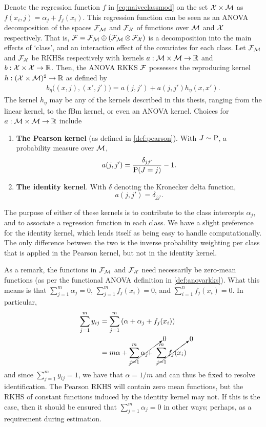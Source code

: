 Denote the regression function $f$ in \cref{eq:naiveclassmod} on the set ${\mathcal X}\times{\mathcal M}$ as $f(x_i,j) = \alpha_j + f_j(x_i)$.
This regression function can be seen as an ANOVA decomposition of the spaces ${\mathcal F}_{\mathcal M}$ and ${\mathcal F}_{\mathcal X}$ of functions over ${\mathcal M}$ and ${\mathcal X}$ respectively. 
That is, ${\mathcal F} = {\mathcal F}_{\mathcal M} \oplus ({\mathcal F}_{\mathcal M} \otimes {\mathcal F}_{\mathcal X})$ is a decomposition into the main effects of `class', and an interaction effect of the covariates for each class.
Let ${\mathcal F}_{\mathcal M}$ and ${\mathcal F}_{\mathcal X}$ be RKHSs respectively with kernels $a:{\mathcal M}\times{\mathcal M}\to\mathbb{R}$ and $b:{\mathcal X}\times{\mathcal X}\to\mathbb{R}$.
Then, the ANOVA RKKS ${\mathcal F}$ possesses the reproducing kernel $h:({\mathcal X} \times {\mathcal M})^2 \to \mathbb{R}$ as defined by
\begin{align}\label{eq:anovaclass}
  b_\eta\big( (x,j), (x',j') \big) = a(j,j') + a(j,j')h_\eta(x,x').  
\end{align}
The kernel $h_\eta$ may be any of the kernels described in this thesis, ranging from the linear kernel, to the fBm kernel, or even an ANOVA kernel.
Choices for $a:{\mathcal M} \times {\mathcal M} \to \mathbb{R}$ include 
\begin{enumerate}
  \item \textbf{The Pearson kernel} (as defined in \cref{def:pearson}). With $J\sim\operatorname{P}$, a probability measure over ${\mathcal M}$,
  \[
    a(j,j') = \frac{\delta_{jj'}}{\operatorname{P}(J=j)} - 1.
  \]
  \item \textbf{The identity kernel}. With $\delta$ denoting the Kronecker delta function,
  \[
    a(j,j') = \delta_{jj'}.
  \]
\end{enumerate}
The purpose of either of these kernels is to contribute to the class intercepts $\alpha_j$, and to associate a regression function in each class.
We have a slight preference for the identity kernel, which lends itself as being easy to handle computationally.
The only difference between the two is the inverse probability weighting per class that is applied in the Pearson kernel, but not in the identity kernel.

As a remark, the functions in ${\mathcal F}_{\mathcal M}$ and ${\mathcal F}_{\mathcal X}$ need necessarily be zero-mean functions (as per the functional ANOVA definition in \cref{def:anovarkks}).
What this means is that $\sum_{j=1}^m \alpha_j = 0$, $\sum_{j=1}^m f_j(x_i) = 0$, and $\sum_{i=1}^n f_j(x_i) = 0$.
In particular,
\begin{align*}
  \sum_{j=1}^m y_{ij} 
  &= \sum_{j=1}^m \left(\alpha + \alpha_j + f_j(x_i) \right) \\
  &= m\alpha + \cancelto{0}{\sum_{j=1}^m \alpha_j \hphantom{aaa}} 
  \hspace{-2em} + \hspace{0.3em} \cancelto{0}{\sum_{j=1}^m f_j(x_i)}
\end{align*}
and since $\sum_{j=1}^m y_{ij} = 1$, we have that $\alpha = 1/m$ and can thus be fixed to resolve identification.
The Pearson RKHS will contain zero mean functions, but the RKHS of constant functions induced by the identity kernel may not.
If this is the case, then it should be ensured that $\sum_{j=1}^m \alpha_j =0$ in other ways; perhaps, as a requirement during estimation.


